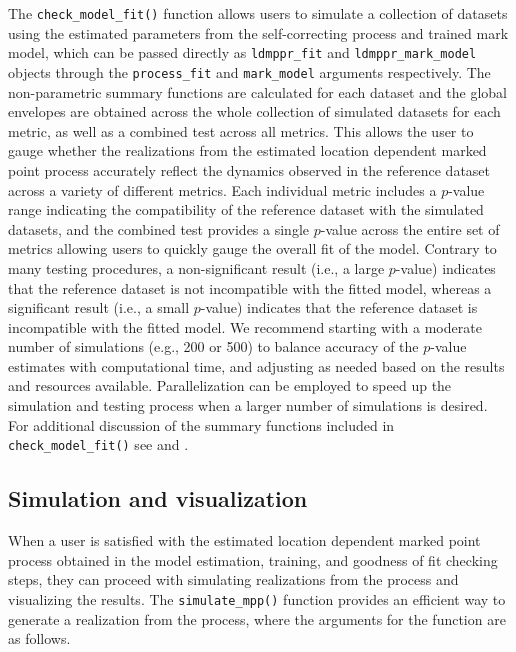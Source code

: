 {The \texttt{check\_model\_fit()} function allows users to simulate a collection
of datasets using the estimated parameters from the self-correcting
process and trained mark model, which can be passed directly as \texttt{ldmppr\_fit} and \texttt{ldmppr\_mark\_model} objects through the \texttt{process\_fit} and \texttt{mark\_model} arguments respectively. The non-parametric summary functions are
calculated for each dataset and the global envelopes are obtained across
the whole collection of simulated datasets for each metric, as well as a
combined test across all metrics. This allows the user to gauge whether
the realizations from the estimated location dependent marked point
process accurately reflect the dynamics observed in the reference
dataset across a variety of different metrics. Each individual metric
includes a \(p\)-value range indicating the compatibility of the reference
dataset with the simulated datasets, and the combined test provides a
single \(p\)-value across the entire set of metrics allowing users to
quickly gauge the overall fit of the model. Contrary to many testing procedures, a non-significant result (i.e., a large \(p\)-value) indicates that the reference dataset is not incompatible with the fitted model, whereas a significant result (i.e., a small \(p\)-value) indicates that the reference dataset is incompatible with the fitted model. We recommend starting with a moderate number of simulations (e.g., 200 or 500) to balance accuracy of the \(p\)-value estimates with computational time, and adjusting as needed based on the results and resources available. Parallelization can be employed to speed up the simulation and testing process when a larger number of simulations is desired.
For additional discussion of the summary functions included in \texttt{check\_model\_fit()} see \citet{mollerStatisticalInferenceSimulation2003} and
\citet{schlatherDetectingDependenceMarks2004}.}

\subsection{Simulation and visualization}\label{simulation-and-visualization}

When a user is satisfied with the estimated location dependent marked
point process obtained in the model estimation, training, and goodness
of fit checking steps, they can proceed with simulating realizations
from the process and visualizing the results. The \texttt{simulate\_mpp()}
function provides an efficient way to generate a realization from the
process, where the arguments for the function are as follows.

